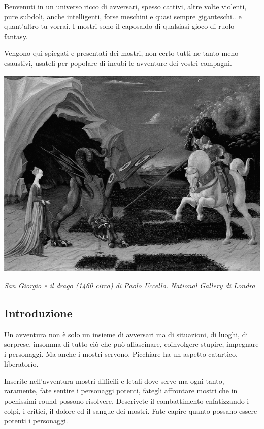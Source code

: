 \begin{multicols}{2}

Benvenuti in un universo ricco di avversari, spesso cattivi, altre volte violenti, pure subdoli, anche intelligenti, forse meschini e quasi sempre giganteschi.. e quant'altro tu vorrai. I mostri sono il caposaldo di qualsiasi gioco di ruolo fantasy.

Vengono qui spiegati e presentati dei mostri, non certo tutti ne tanto meno esaustivi, usateli per popolare di incubi le avventure dei vostri compagni.

\medskip

\begin{center}

\includegraphics[width=0.9\linewidth]{immagini/sangiorgioedrago.png}

\emph{San Giorgio e il drago (1460 circa) di Paolo Uccello. National Gallery di Londra}
\end{center}

\subsection{Introduzione}

Un avventura non è solo un insieme di avversari ma di situazioni, di luoghi, di sorprese, insomma di tutto ciò che può affascinare, coinvolgere stupire, impegnare i personaggi. Ma anche i mostri servono. Picchiare ha un aspetto catartico, liberatorio.

Inserite nell'avventura mostri difficili e letali dove serve ma ogni tanto, raramente, fate sentire i personaggi potenti, fategli affrontare mostri che in pochissimi round possono risolvere. Descrivete il combattimento enfatizzando i colpi, i critici, il dolore ed il sangue dei mostri. Fate capire quanto possano essere potenti i personaggi.


\end{multicols}

